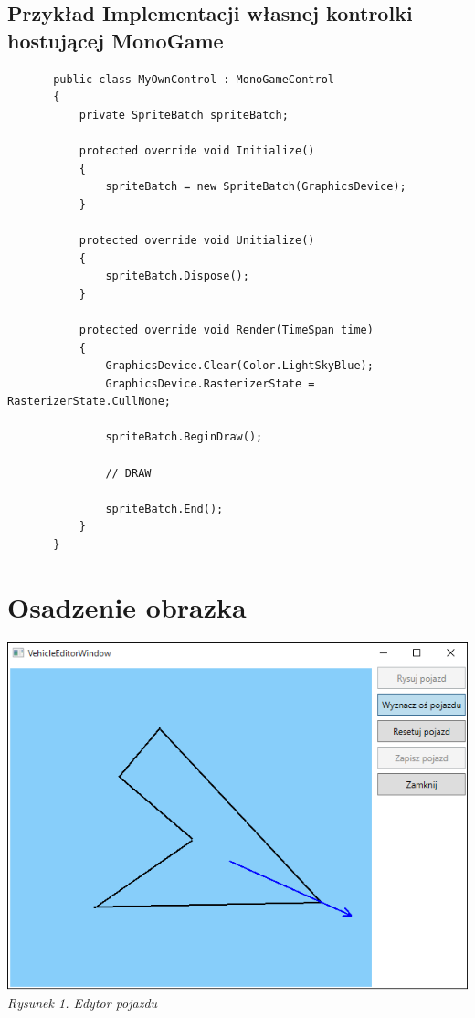 \documentclass{article}
\let\oldsection\section
\renewcommand\section{\clearpage\oldsection} %
\begin{document}
\subsection{Przykład Implementacji własnej kontrolki hostującej MonoGame}
\begin{lstlisting}
       public class MyOwnControl : MonoGameControl
       {
           private SpriteBatch spriteBatch;
    
           protected override void Initialize()
           {
               spriteBatch = new SpriteBatch(GraphicsDevice);
           }

           protected override void Unitialize()
           {
               spriteBatch.Dispose();
           }

           protected override void Render(TimeSpan time)
           {
               GraphicsDevice.Clear(Color.LightSkyBlue);
               GraphicsDevice.RasterizerState = RasterizerState.CullNone;

               spriteBatch.BeginDraw();

               // DRAW

               spriteBatch.End();
           }
       }
\end{lstlisting}

\section{Osadzenie obrazka}

\begin{center}
\includegraphics[scale=0.7]{vehicleeditor}\\
\textit{Rysunek 1. Edytor pojazdu}
\end{center}
\end{document}
